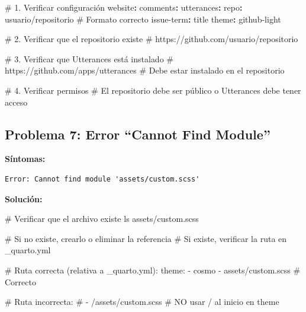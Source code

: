 \documentclass[
  doc,
  floatsintext,
  longtable,
  a4paper,
  nolmodern,
  notxfonts,
  notimes,
  12pt,
  colorlinks=true,linkcolor=blue,citecolor=blue,urlcolor=blue]{apa7}
\newenvironment{Shaded}{\begin{snugshade}}{\end{snugshade}}
\newcommand{\AttributeTok}[1]{\textcolor[rgb]{0.40,0.45,0.13}{#1}}
\newcommand{\CommentTok}[1]{\textcolor[rgb]{0.37,0.37,0.37}{#1}}
\newcommand{\ExtensionTok}[1]{\textcolor[rgb]{0.00,0.23,0.31}{#1}}
\newcommand{\FunctionTok}[1]{\textcolor[rgb]{0.28,0.35,0.67}{#1}}
\newcommand{\KeywordTok}[1]{\textcolor[rgb]{0.00,0.23,0.31}{\textbf{#1}}}
\newcommand{\NormalTok}[1]{\textcolor[rgb]{0.00,0.23,0.31}{#1}}
\begin{document}
\begin{Shaded}
\begin{Highlighting}[]
\CommentTok{\# 1. Verificar configuración}
\FunctionTok{website}\KeywordTok{:}
\AttributeTok{  }\FunctionTok{comments}\KeywordTok{:}
\AttributeTok{    }\FunctionTok{utterances}\KeywordTok{:}
\AttributeTok{      }\FunctionTok{repo}\KeywordTok{:}\AttributeTok{ usuario/repositorio}\CommentTok{    \# Formato correcto}
\AttributeTok{      }\FunctionTok{issue{-}term}\KeywordTok{:}\AttributeTok{ title}
\AttributeTok{      }\FunctionTok{theme}\KeywordTok{:}\AttributeTok{ github{-}light}

\CommentTok{\# 2. Verificar que el repositorio existe}
\CommentTok{\# https://github.com/usuario/repositorio}

\CommentTok{\# 3. Verificar que Utterances está instalado}
\CommentTok{\# https://github.com/apps/utterances}
\CommentTok{\# Debe estar instalado en el repositorio}

\CommentTok{\# 4. Verificar permisos}
\CommentTok{\# El repositorio debe ser público o Utterances debe tener acceso}
\end{Highlighting}
\end{Shaded}

\subsection{Problema 7: Error ``Cannot Find
Module''}\label{problema-7-error-cannot-find-module}

\textbf{Síntomas:}

\begin{verbatim}
Error: Cannot find module 'assets/custom.scss'
\end{verbatim}

\textbf{Solución:}

\begin{Shaded}
\begin{Highlighting}[]
\CommentTok{\# Verificar que el archivo existe}
\FunctionTok{ls}\NormalTok{ assets/custom.scss}

\CommentTok{\# Si no existe, crearlo o eliminar la referencia}
\CommentTok{\# Si existe, verificar la ruta en \_quarto.yml}

\CommentTok{\# Ruta correcta (relativa a \_quarto.yml):}
\ExtensionTok{theme:}
  \ExtensionTok{{-}}\NormalTok{ cosmo}
  \ExtensionTok{{-}}\NormalTok{ assets/custom.scss    }\CommentTok{\# Correcto}

\CommentTok{\# Ruta incorrecta:}
\CommentTok{\# {-} /assets/custom.scss   \# NO usar / al inicio en theme}
\end{Highlighting}
\end{Shaded}
\end{document}
